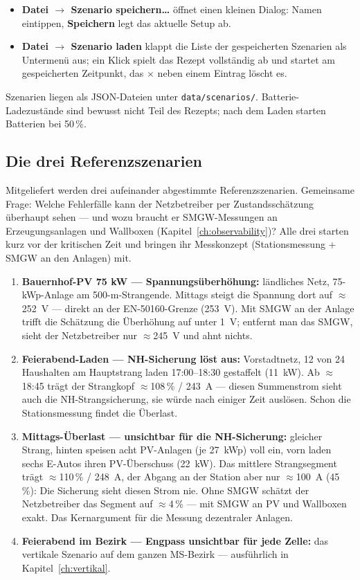 \documentclass[11pt,a4paper,parskip=half]{scrreprt}
\newcommand{\ui}[1]{\textsf{\bfseries #1}}          %
\begin{document}
\begin{itemize}[nosep]
  \item \ui{Datei \(\to\) Szenario speichern\ldots} öffnet einen
    kleinen Dialog: Namen eintippen, \ui{Speichern} legt das
    aktuelle Setup ab.
  \item \ui{Datei \(\to\) Szenario laden} klappt die Liste der
    gespeicherten Szenarien als Untermenü aus; ein Klick spielt
    das Rezept vollständig ab und startet am gespeicherten Zeitpunkt,
    das $\times$ neben einem Eintrag löscht es.
\end{itemize}

Szenarien liegen als JSON-Dateien unter \texttt{data/scenarios/}.
Batterie-Ladezustände sind bewusst nicht Teil des Rezepts; nach dem
Laden starten Batterien bei 50\,\%.

\subsection*{Die drei Referenzszenarien}

Mitgeliefert werden drei aufeinander abgestimmte Referenzszenarien.
Gemeinsame Frage: Welche Fehlerfälle kann der Netzbetreiber per
Zustandsschätzung überhaupt sehen --- und wozu braucht er
SMGW-Messungen an Erzeugungsanlagen und Wallboxen
(Kapitel~\ref{ch:observability})? Alle drei starten kurz vor der
kritischen Zeit und bringen ihr Messkonzept (Stationsmessung + SMGW
an den Anlagen) mit.

\begin{enumerate}[nosep]
  \item \textbf{Bauernhof-PV 75 kW --- Spannungsüberhöhung:}
    ländliches Netz, 75-kWp-Anlage am 500-m-Strangende. Mittags
    steigt die Spannung dort auf $\approx$252~V --- direkt an der
    EN-50160-Grenze (253~V). Mit SMGW an der Anlage trifft die
    Schätzung die Überhöhung auf unter 1~V; entfernt man das SMGW,
    sieht der Netzbetreiber nur $\approx$245~V und ahnt nichts.
  \item \textbf{Feierabend-Laden --- NH-Sicherung löst aus:}
    Vorstadtnetz, 12 von 24 Haushalten am Hauptstrang laden
    17:00--18:30 gestaffelt (11~kW). Ab $\approx$18:45 trägt der
    Strangkopf $\approx$108\,\% / 243~A --- diesen Summenstrom sieht
    auch die NH-Strangsicherung, sie würde nach einiger Zeit
    auslösen. Schon die Stationsmessung findet die Überlast.
  \item \textbf{Mittags-Überlast --- unsichtbar für die
    NH-Sicherung:} gleicher Strang, hinten speisen acht PV-Anlagen
    (je 27~kWp) voll ein, vorn laden sechs E-Autos ihren
    PV-Überschuss (22~kW). Das mittlere Strangsegment trägt
    $\approx$110\,\% / 248~A, der Abgang an der Station aber nur
    $\approx$100~A (45\,\%): Die Sicherung sieht diesen Strom nie.
    Ohne SMGW schätzt der Netzbetreiber das Segment auf
    $\approx$4\,\% --- mit SMGW an PV und Wallboxen exakt. Das
    Kernargument für die Messung dezentraler Anlagen.
  \item \textbf{Feierabend im Bezirk --- Engpass unsichtbar für jede
    Zelle:} das vertikale Szenario auf dem ganzen MS-Bezirk ---
    ausführlich in Kapitel~\ref{ch:vertikal}.
\end{enumerate}
\end{document}
